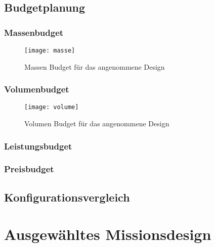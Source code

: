 				\subsection{Budgetplanung}
				
						\subsubsection{Massenbudget}
								
										\begin{figure}[h]
											\centering
												\texttt{[image: masse]}
											\caption{Massen Budget für das angenommene Design}
											\label{fig:masse}
										\end{figure}
										
						\subsubsection{Volumenbudget}
								
										\begin{figure}[h]
											\centering
												\texttt{[image: volume]}
											\caption{Volumen Budget für das angenommene Design}
											\label{fig:volume}
										\end{figure}
								
						\subsubsection{Leistungsbudget}
						\subsubsection{Preisbudget}
				
				\subsection{Konfigurationsvergleich}
		
		\section{	Ausgewähltes Missionsdesign}
				
